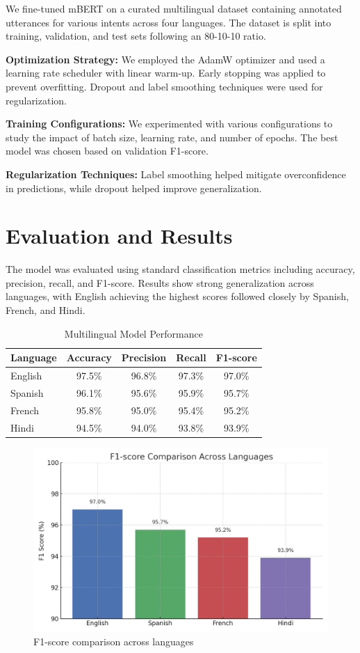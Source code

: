 \documentclass{ecai}
\begin{document}
We fine-tuned mBERT on a curated multilingual dataset containing annotated utterances for various intents across four languages. The dataset is split into training, validation, and test sets following an 80-10-10 ratio.

\textbf{Optimization Strategy:} We employed the AdamW optimizer and used a learning rate scheduler with linear warm-up. Early stopping was applied to prevent overfitting. Dropout and label smoothing techniques were used for regularization.

\textbf{Training Configurations:} We experimented with various configurations to study the impact of batch size, learning rate, and number of epochs. The best model was chosen based on validation F1-score.

\textbf{Regularization Techniques:} Label smoothing helped mitigate overconfidence in predictions, while dropout helped improve generalization.


\section{Evaluation and Results}
The model was evaluated using standard classification metrics including accuracy, precision, recall, and F1-score. Results show strong generalization across languages, with English achieving the highest scores followed closely by Spanish, French, and Hindi.

\begin{table}[H]
\centering
\caption{Multilingual Model Performance}
\begin{tabular}{lcccc}
\toprule
Language & Accuracy & Precision & Recall & F1-score \\
\midrule
English  & 97.5\%   & 96.8\%    & 97.3\% & 97.0\% \\
Spanish  & 96.1\%   & 95.6\%    & 95.9\% & 95.7\% \\
French   & 95.8\%   & 95.0\%    & 95.4\% & 95.2\% \\
Hindi    & 94.5\%   & 94.0\%    & 93.8\% & 93.9\% \\
\bottomrule
\end{tabular}
\end{table}

\begin{figure}[h]
\centering
\includegraphics[width=0.8\linewidth]{f1_chart.png}
\caption{F1-score comparison across languages}
\end{figure}
\end{document}
